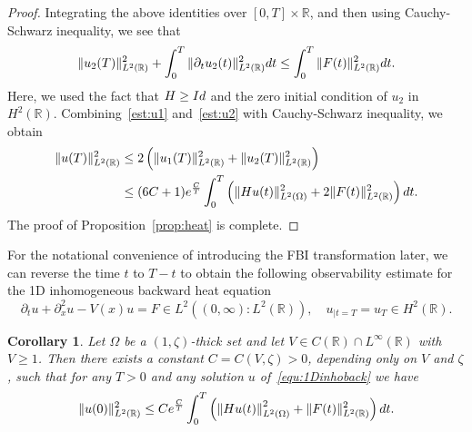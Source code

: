 \documentclass[a4paper,reqno]{amsart}
\newtheorem{corollary}[theorem]{Corollary}
\theoremstyle{definition}
\numberwithin{equation}{section}
\newcommand{\R}{\mathbb{R}}
\def \R {{\mathbb{R} }}
\def \d {{\rm{d}}}
\begin{document}
\begin{proof}
             Integrating the above identities over $[0,T]\times \R$, and then using Cauchy-Schwarz inequality, we see that 
             \begin{equation}\label{est:u2}
                    \|u_{2}(T)\|_{L^{2}(\R)}^{2}+\int_{0}^{T}\|\partial_{t}u_{2}(t)\|_{L^{2}(\R)}^{2}\d t\le \int_{0}^{T}\|F(t)\|_{L^{2}(\R)}^{2}\d t.
             \end{equation}
             Here, we used the fact that $H\ge {\rm{Id}}$ and the zero initial condition of $u_2$ in $H^2(\R)$. 
             Combining~\eqref{est:u1} and~\eqref{est:u2} with Cauchy-Schwarz inequality, we obtain
             \begin{equation*}
             \begin{aligned}
                 \|u(T)\|_{L^{2}(\R)}^{2}
                 &\le 2\left(\|u_{1}(T)\|_{L^{2}(\R)}^{2}+\|u_{2}(T)\|_{L^{2}(\R)}^{2}\right)\\
                 &\le (6C+1)e^{\frac{C}{T}}\int_{0}^{T}\left(\|Hu(t)\|^{2}_{L^{2}(\Omega)}+2\|F(t)\|^{2}_{L^{2}(\R)}\right)\d t.         
                 \end{aligned}
                 \end{equation*}
        The proof of Proposition~\ref{prop:heat} is complete.
\end{proof}

For the notational convenience of introducing the FBI transformation later, we can reverse the time $t$ to $T-t$ to obtain the following observability estimate for the 1D inhomogeneous backward heat equation
\begin{equation}\label{equ:1Dinhoback}
    \partial_{t}u+\partial_{x}^{2}u-V(x)u=F\in L^{2}((0,\infty):L^{2}(\R)),\quad  u_{|t=T}=u_{T}\in H^{2}(\R).
    \end{equation}

\begin{corollary}\label{coro:1Dheatback}
   Let $\Omega$ be a $(1,\zeta)$-thick set and let $V\in C(\R)\cap L^{\infty}(\R)$ with $V\ge 1$. 
Then there exists a constant $C=C(V,\zeta)>0$, depending only on $V$ and $\zeta$, such that for any $T>0$ and any solution $u$ of~\eqref{equ:1Dinhoback} we have 
  \begin{equation*}
  \|u(0)\|_{L^{2}(\R)}^{2}\le Ce^{\frac{C}{T}}\int_{0}^{T}\left(\left\|Hu(t)\right\|^{2}_{L^{2}(\Omega)}+\|F(t)\|^{2}_{L^{2}(\R)}\right)\d t.
  \end{equation*}
  \end{corollary}
    
\end{document}
